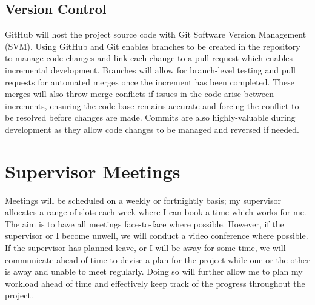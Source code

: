 \subsection{Version Control}
\label{pm:version_control}

GitHub will host the project source code with Git Software Version Management (SVM). Using GitHub and Git enables branches to be created in the repository to manage code changes and link each change to a pull request which enables incremental development. Branches will allow for branch-level testing and pull requests for automated merges once the increment has been completed. These merges will also throw merge conflicts if issues in the code arise between increments, ensuring the code base remains accurate and forcing the conflict to be resolved before changes are made. Commits are also highly-valuable during development as they allow code changes to be managed and reversed if needed. 

\section{Supervisor Meetings}
\label{pm:supervisor_meetings}

Meetings will be scheduled on a weekly or fortnightly basis; my supervisor allocates a range of slots each week where I can book a time which works for me. The aim is to have all meetings face-to-face where possible. However, if the supervisor or I become unwell, we will conduct a video conference where possible. If the supervisor has planned leave, or I will be away for some time, we will communicate ahead of time to devise a plan for the project while one or the other is away and unable to meet regularly. Doing so will further allow me to plan my workload ahead of time and effectively keep track of the progress throughout the project.

